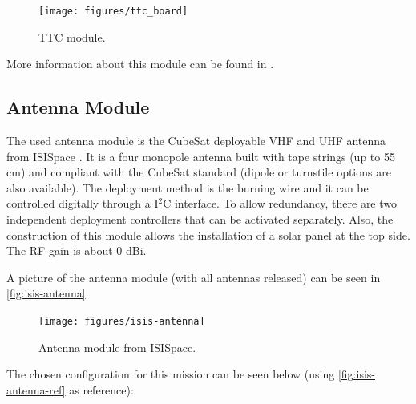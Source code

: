 \begin{figure}[!ht]
    \begin{center}
        \texttt{[image: figures/ttc\_board]}
        \caption{TTC module.}
        \label{fig:ttc}
    \end{center}
\end{figure}

More information about this module can be found in \cite{ttc}.

\subsection{Antenna Module}

The used antenna module is the CubeSat deployable VHF and UHF antenna from ISISpace \cite{isis-antenna}. It is a four monopole antenna built with tape strings (up to 55 cm) and compliant with the CubeSat standard (dipole or turnstile options are also available). The deployment method is the burning wire and it can be controlled digitally through a I$^{2}$C interface. To allow redundancy, there are two independent deployment controllers that can be activated separately. Also, the construction of this module allows the installation of a solar panel at the top side. The RF gain is about 0 dBi.

A picture of the antenna module (with all antennas released) can be seen in \autoref{fig:isis-antenna}.

\begin{figure}[!ht]
    \begin{center}
        \texttt{[image: figures/isis-antenna]}
        \caption{Antenna module from ISISpace.}
        \label{fig:isis-antenna}
    \end{center}
\end{figure}

The chosen configuration for this mission can be seen below (using \autoref{fig:isis-antenna-ref} as reference):

